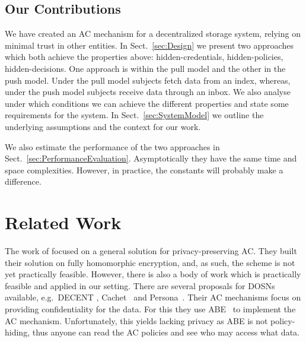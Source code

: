 \subsection{Our Contributions}

We have created an \ac{AC} mechanism for a decentralized storage system, 
relying on minimal trust in other entities.
In Sect.~\ref{sec:Design} we present two approaches which both achieve the 
properties above:
hidden-credentials,
hidden-policies,
hidden-decisions.
One approach is within the pull model and the other in the push model.
Under the pull model subjects fetch data from an index, whereas, under the push 
model subjects receive data through an inbox.
We also analyse under which conditions we can achieve the different properties 
and state some requirements for the system.
In Sect.~\ref{sec:SystemModel} we outline the underlying assumptions and the 
context for our work.

We also estimate the performance of the two approaches in 
Sect.~\ref{sec:PerformanceEvaluation}.
Asymptotically they have the same time and space complexities.
However, in practice, the constants will probably make a difference.


\section{Related Work}\label{sec:RelatedWork}

The work of \citet{TowardsPPACwHPHCHD} focused on a general solution for 
privacy-preserving \ac{AC}.
They built their solution on fully homomorphic encryption, and, as such, the 
scheme is not yet practically feasible.
However, there is also a body of work which is practically feasible and applied 
in our setting.
There are several proposals for \acp{DOSN} available, e.g.~DECENT
\cite{DECENT}, Cachet~\cite{Cachet} and Persona~\cite{Persona}.
Their \ac{AC} mechanisms focus on providing confidentiality for the 
data.
For this they use \ac{ABE}~\cite{abe} to implement the \ac{AC} mechanism.
Unfortunately, this yields lacking privacy as \ac{ABE} is not policy-hiding, 
thus anyone can read the \ac{AC} policies and see who may access what data.

